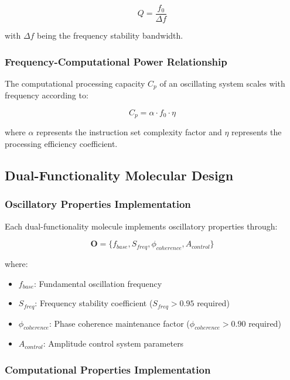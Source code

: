 \begin{equation}
Q = \frac{f_0}{\Delta f}
\end{equation}

with $\Delta f$ being the frequency stability bandwidth.

\subsubsection{Frequency-Computational Power Relationship}

The computational processing capacity $C_p$ of an oscillating system scales with frequency according to:

\begin{equation}
C_p = \alpha \cdot f_0 \cdot \eta
\end{equation}

where $\alpha$ represents the instruction set complexity factor and $\eta$ represents the processing efficiency coefficient.

\subsection{Dual-Functionality Molecular Design}

\subsubsection{Oscillatory Properties Implementation}

Each dual-functionality molecule implements oscillatory properties through:

\begin{equation}
\boldsymbol{O} = \{f_{base}, S_{freq}, \phi_{coherence}, A_{control}\}
\end{equation}

where:
\begin{itemize}
\item $f_{base}$: Fundamental oscillation frequency
\item $S_{freq}$: Frequency stability coefficient ($S_{freq} > 0.95$ required)
\item $\phi_{coherence}$: Phase coherence maintenance factor ($\phi_{coherence} > 0.90$ required)  
\item $A_{control}$: Amplitude control system parameters
\end{itemize}

\subsubsection{Computational Properties Implementation}

